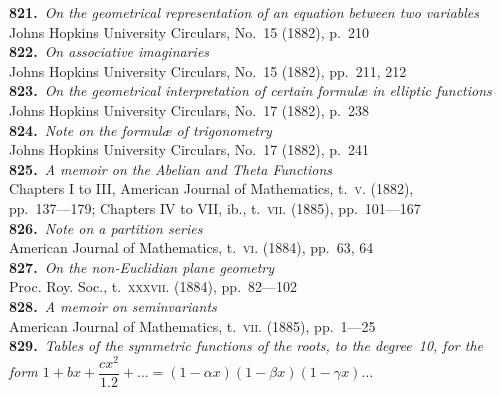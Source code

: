 \documentclass[11pt,a4paper]{article}
\providecommand{\textsc}[1]{{\scshape #1}}
\begin{document}
\small
\noindent\textbf{821.}~\textit{On the geometrical representation of an equation between two variables}~\\
\hspace*{2em}Johns Hopkins University Circulars, No.~15 (1882), p.~210\\[0.3em]
\textbf{822.}~\textit{On associative imaginaries}~\\
\hspace*{2em}Johns Hopkins University Circulars, No.~15 (1882), pp.~211, 212\\[0.3em]
\textbf{823.}~\textit{On the geometrical interpretation of certain formul\ae{} in elliptic functions}~\\
\hspace*{2em}Johns Hopkins University Circulars, No.~17 (1882), p.~238\\[0.3em]
\textbf{824.}~\textit{Note on the formul\ae{} of trigonometry}~\\
\hspace*{2em}Johns Hopkins University Circulars, No.~17 (1882), p.~241\\[0.3em]
\textbf{825.}~\textit{A memoir on the Abelian and Theta Functions}~\\
\hspace*{2em}Chapters I to III, American Journal of Mathematics, t.~\textsc{v}. (1882),\\
\hspace*{2em}pp.~137---179; Chapters IV to VII, ib., t.~\textsc{vii}. (1885), pp.~101---167\\[0.3em]
\textbf{826.}~\textit{Note on a partition series}~\\
\hspace*{2em}American Journal of Mathematics, t.~\textsc{vi}. (1884), pp.~63, 64\\[0.3em]
\textbf{827.}~\textit{On the non-Euclidian plane geometry}~\\
\hspace*{2em}Proc. Roy. Soc., t.~\textsc{xxxvii}. (1884), pp.~82---102\\[0.3em]
\textbf{828.}~\textit{A memoir on seminvariants}~\\
\hspace*{2em}American Journal of Mathematics, t.~\textsc{vii}. (1885), pp.~1---25\\[0.3em]
\textbf{829.}~\textit{Tables of the symmetric functions of the roots, to the degree~10, for the form
$1 + bx + \dfrac{cx^{2}}{1.2} + \ldots = (1-\alpha x)(1-\beta x)(1-\gamma x)\ldots$}~\\
\end{document}
